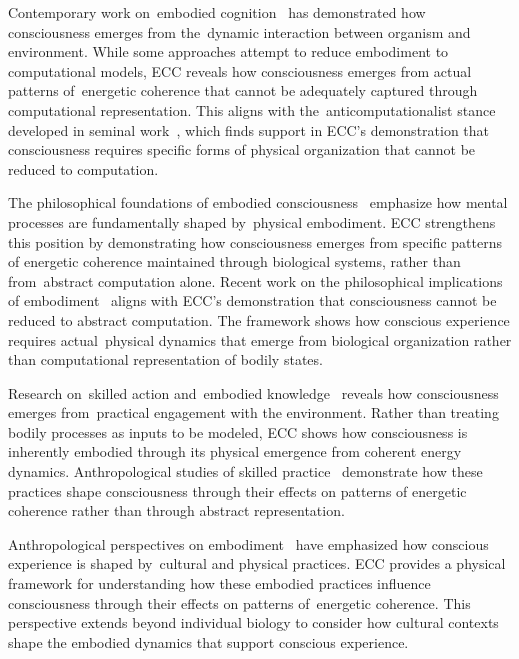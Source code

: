 Contemporary work on~embodied cognition~\cite{Clark1997, clark1998being} has demonstrated how consciousness emerges from the~dynamic interaction between organism and environment. While some approaches attempt to reduce embodiment to computational models, ECC reveals how consciousness emerges from actual patterns of~energetic coherence that cannot be adequately captured through computational representation. This aligns with the~anticomputationalist stance developed in seminal work~\cite{Dreyfus1992, searle1980minds}, which finds support in ECC's demonstration that consciousness requires specific forms of physical organization that cannot be reduced to computation.

The philosophical foundations of embodied consciousness~\cite{Lakoff1999, Varela2017} emphasize how mental processes are fundamentally shaped by~physical embodiment. ECC strengthens this position by demonstrating how consciousness emerges from specific patterns of energetic coherence maintained through biological systems, rather than from~abstract computation alone. Recent work on the philosophical implications of embodiment~\cite{Lakoff1999, varela1996neurophenomenology} aligns with ECC's demonstration that consciousness cannot be reduced to abstract computation. The framework shows how conscious experience requires actual~physical dynamics that emerge from biological organization rather than computational representation of bodily states.

Research on~skilled action and~embodied knowledge~\cite{Ingold2000, Noe2004} reveals how consciousness emerges from~practical engagement with the environment. Rather than treating bodily processes as inputs to be modeled, ECC shows how consciousness is inherently embodied through its physical emergence from coherent energy dynamics. Anthropological studies of skilled practice~\cite{Marchand2010, Ingold2000} demonstrate how these practices shape consciousness through their effects on patterns of energetic coherence rather than through abstract representation.

Anthropological perspectives on embodiment~\cite{Csordas1994, Marchand2010} have emphasized how conscious experience is shaped by~cultural and physical practices. ECC provides a physical framework for understanding how these embodied practices influence consciousness through their effects on patterns of~energetic coherence. This perspective extends beyond individual biology to consider how cultural contexts shape the embodied dynamics that support conscious experience.

